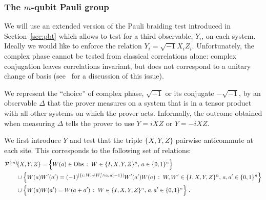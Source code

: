 \subsubsection{The \texorpdfstring{$m$}{m}-qubit Pauli group}
\label{sec:e-pbt}

We will use an extended version of the Pauli braiding test introduced in Section~\ref{sec:pbt} which allows to test for a third observable, $Y_i$, on each system. Ideally we would like to enforce the relation $Y_i=\sqrt{-1}X_iZ_i$. Unfortunately, the complex phase cannot be tested from classical correlations alone: complex conjugation leaves correlations invariant, but does not correspond to a unitary change of basis  (see~\cite[Appendix A]{reichardt2012classicalarxiv} for a discussion of this issue). 

We represent the ``choice'' of complex phase, $\sqrt{-1}$ or its conjugate $-\sqrt{-1}$, by an observable $\Delta$ that the prover measures on a system that is in a tensor product with all other systems on which the prover acts. Informally, the outcome obtained when measuring $\Delta$ tells the prover to use $Y = i XZ$ or $Y=-iXZ$. 

We first introduce $Y$ and test that the triple $\{X,Y,Z\}$ pairwise anticommute at each site. This corresponds to the following set of relations: 
\begin{align*}
& {\mathcal{P}^{(m)}\!}\{X,Y,Z\} = \Big\{ W(a)\in\mathrm{Obs}\,:\;W \in \{I,X,Y,Z\}^n,\,a\in\{0,1\}^n\Big\} \\
&\qquad\cup \Big\{W(a)W'(a')=(-1)^{|\{i:\,W_i\neq W'_i \wedge a_ia'_i=1\}|} W'(a')W(a)\,:\;W,W' \in \{I,X,Y,Z\}^n,\,a,a'\in\{0,1\}^n\Big\}\\
&\qquad \cup\Big\{ W(a)W(a')=W(a+a')\,:\;W \in \{I,X,Y,Z\}^n,\,a,a'\in\{0,1\}^n\Big\}\;.
\end{align*}


